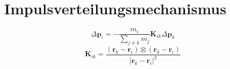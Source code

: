 \section{Impulsverteilungsmechanismus}
\[
\Delta \mathbf{p}_i = -\frac{m_i}{\sum_{j \neq k} m_j} \mathbf{K}_{ik} \Delta \mathbf{p}_k
\]
\[
\mathbf{K}_{ik} = \frac{(\mathbf{r}_k - \mathbf{r}_i) \otimes (\mathbf{r}_k - \mathbf{r}_i)}{|\mathbf{r}_k - \mathbf{r}_i|^2}
\]